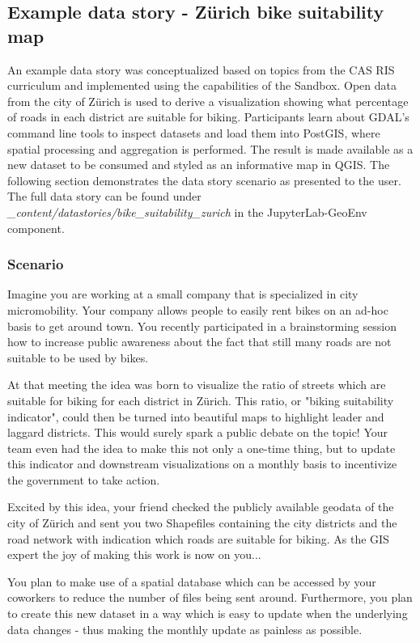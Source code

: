 \documentclass[11pt, a4paper, oneside, parskip=full-]{scrartcl}
\begin{document}
\subsection{Example data story - Zürich bike suitability map}
An example data story was conceptualized based on topics from the CAS RIS
curriculum and implemented using the capabilities of the Sandbox. Open data from
the city of Zürich is used to derive a visualization showing what percentage of
roads in each district are suitable for biking. Participants learn about GDAL's
command line tools to inspect datasets and load them into PostGIS, where spatial
processing and aggregation is performed. The result is made available as a new
dataset to be consumed and styled as an informative map in QGIS. The following
section demonstrates the data story scenario as presented to the user. The full
data story can be found under
\emph{\_content/datastories/bike\_suitability\_zurich} in the JupyterLab-GeoEnv
component.

\subsubsection*{Scenario}

Imagine you are working at a small company that is specialized in city
micromobility. Your company allows people to easily rent bikes on an ad-hoc
basis to get around town. You recently participated in a brainstorming session
how to increase public awareness about the fact that still many roads are not
suitable to be used by bikes.

At that meeting the idea was born to visualize the ratio of streets which are
suitable for biking for each district in Zürich. This ratio, or "biking
suitability indicator", could then be turned into beautiful maps to highlight
leader and laggard districts. This would surely spark a public debate on the
topic! Your team even had the idea to make this not only a one-time thing, but
to update this indicator and downstream visualizations on a monthly basis to
incentivize the government to take action.

Excited by this idea, your friend checked the publicly available geodata of the
city of Zürich and sent you two Shapefiles containing the city districts and the
road network with indication which roads are suitable for biking. As the GIS
expert the joy of making this work is now on you...

You plan to make use of a spatial database which can be accessed by your
coworkers to reduce the number of files being sent around. Furthermore, you plan
to create this new dataset in a way which is easy to update when the underlying
data changes - thus making the monthly update as painless as possible.
\end{document}

